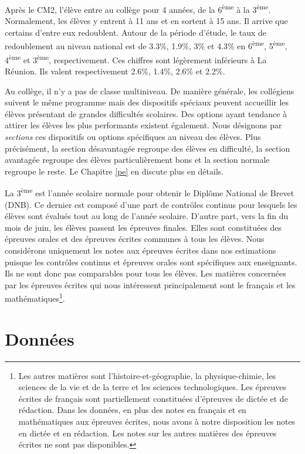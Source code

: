 \documentclass[
]{book}
\begin{document}
\quad Après le CM2, l'élève entre au collège pour 4 années, de la 6\textsuperscript{ème} à la 3\textsuperscript{ème}. Normalement, les élèves y entrent à 11 ans et en sortent à 15 ans. Il arrive que certains d'entre eux redoublent. Autour de la période d'étude, le taux de redoublement au niveau national est de 3.3\%, 1.9\%, 3\% et 4.3\% en 6\textsuperscript{ème}, 5\textsuperscript{ème}, 4\textsuperscript{ème} et 3\textsuperscript{ème}, respectivement. Ces chiffres sont légèrement inférieurs à La Réunion. Ils valent respectivement 2.6\%, 1.4\%, 2.6\% et 2.2\%.

\quad Au collège, il n'y a pas de classe multiniveau.
De manière générale, les collégiens suivent le même programme mais des dispositifs spéciaux peuvent accueillir les élèves présentant de grandes difficultés scolaires. Des options ayant tendance à attirer les élèves les plus performants existent également. Nous désignons par \emph{sections} ces dispositifs ou options spécifiques au niveau des élèves. Plus précisément, la section désavantagée regroupe des élèves en difficulté, la section avantagée regroupe des élèves particulièrement bons et la section normale regroupe le reste. Le Chapitre \ref{pe} en discute plus en détails.

\quad La 3\textsuperscript{ème} est l'année scolaire normale pour obtenir le Diplôme National de Brevet (DNB). Ce dernier est composé d'une part de contrôles continus pour lesquels les élèves sont évalués tout au long de l'année scolaire. D'autre part, vers la fin du mois de juin, les élèves passent les épreuves finales. Elles sont constituées des épreuves orales et des épreuves écrites communes à tous les élèves. Nous considérons uniquement les notes aux épreuves écrites dans nos estimations puisque les contrôles continus et épreuves orales sont spécifiques aux enseignants. Ils ne sont donc pas comparables pour tous les élèves. Les matières concernées par les épreuves écrites qui nous intéressent principalement sont le français et les mathématiques\footnote{Les autres matières sont l'histoire-et-géographie, la physique-chimie, les sciences de la vie et de la terre et les sciences technologiques. Les épreuves écrites de français sont partiellement constituées d'épreuves de dictée et de rédaction. Dans les données, en plus des notes en français et en mathématiques aux épreuves écrites, nous avons à notre disposition les notes en dictée et en rédaction. Les notes sur les autres matières des épreuves écrites ne sont pas disponibles.}.

\hypertarget{agedata}{%
\section{Données}\label{agedata}}
\end{document}
